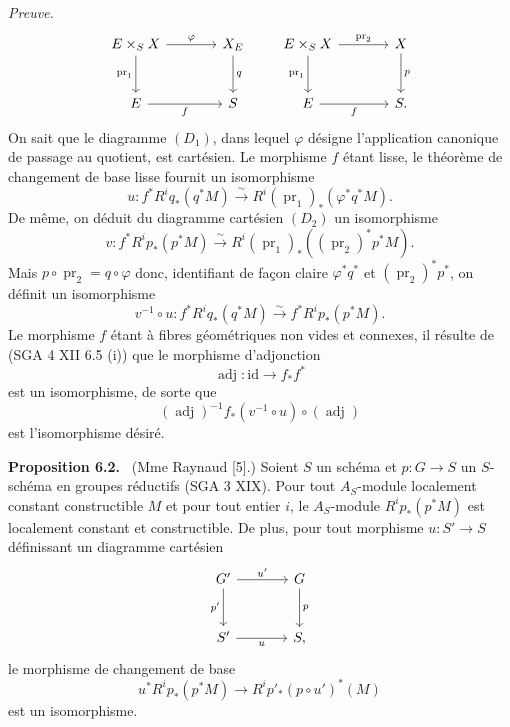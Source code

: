 \documentclass[11pt]{article}
\newenvironment{statement}[1]{\par\medskip\noindent\textbf{#1.}\ }{\par\medskip}
\providecommand{\pr}{\operatorname{pr}}
\providecommand{\pr}{\operatorname{pr}}
\begin{document}
\emph{Preuve.}
\[
\begin{tikzcd}[column sep=large,row sep=large]
E\times_S X \arrow[r,"\varphi"] \arrow[d,"\pr_1"'] & X_E \arrow[d,"q"]\\
E \arrow[r,"f"'] & S
\end{tikzcd}
\qquad
\begin{tikzcd}[column sep=large,row sep=large]
E\times_S X \arrow[r,"\pr_2"] \arrow[d,"\pr_1"'] & X \arrow[d,"p"]\\
E \arrow[r,"f"'] & S .
\end{tikzcd}
\]
On sait que le diagramme $(D_1)$, dans lequel $\varphi$ désigne l'application canonique de passage au quotient, est cartésien. Le morphisme $f$ étant lisse, le théorème de changement de base lisse fournit un isomorphisme
\[
u:f^*R^iq_*(q^*M)\xrightarrow{\sim}R^i(\pr_1)_*(\varphi^*q^*M).
\]
De même, on déduit du diagramme cartésien $(D_2)$ un isomorphisme
\[
v:f^*R^ip_*(p^*M)\xrightarrow{\sim}R^i(\pr_1)_*((\pr_2)^*p^*M).
\]
Mais $p\circ\pr_2=q\circ\varphi$ donc, identifiant de façon claire $\varphi^*q^*$ et $(\pr_2)^*p^*$, on définit un isomorphisme
\[
v^{-1}\circ u:f^*R^iq_*(q^*M)\xrightarrow{\sim} f^*R^ip_*(p^*M).
\]
Le morphisme $f$ étant à fibres géométriques non vides et connexes, il résulte de (SGA 4 XII 6.5 (i)) que le morphisme d'adjonction
\[
\operatorname{adj}:\mathrm{id}\to f_*f^*
\]
est un isomorphisme, de sorte que
\[
(\operatorname{adj})^{-1} f_*(v^{-1}\circ u)\circ(\operatorname{adj})
\]
est l'isomorphisme désiré.

\begin{statement}{Proposition 6.2}
(Mme Raynaud [5].) Soient $S$ un schéma et $p:G\to S$ un $S$-schéma en groupes réductifs (SGA 3 XIX). Pour tout $A_S$-module localement constant constructible $M$ et pour tout entier $i$, le $A_S$-module $R^ip_*(p^*M)$ est localement constant et constructible. De plus, pour tout morphisme $u:S'\to S$ définissant un diagramme cartésien
\[
\begin{tikzcd}[column sep=large,row sep=large]
G' \arrow[r,"u'"] \arrow[d,"p'"'] & G \arrow[d,"p"]\\
S' \arrow[r,"u"'] & S,
\end{tikzcd}
\]
le morphisme de changement de base
\[
u^*R^ip_*(p^*M)\to R^ip'_*(p\circ u')^*(M)
\]
est un isomorphisme.
\end{statement}
\end{document}
